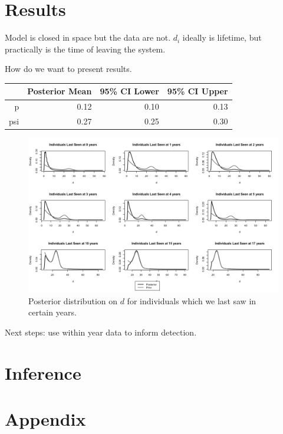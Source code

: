 \documentclass[12pt, a4paper]{article}
\begin{document}
\section{Results}

Model is closed in space but the data are not. $d_i$ ideally is lifetime, but practically is the time of leaving the system. 

How do we want to present results. 

\begin{table}[ht]
\centering
\begin{tabular}{rrrr}
  \hline
   & Posterior Mean & 95\% CI Lower & 95\% CI Upper \\ 
  \hline
  p & 0.12 & 0.10 & 0.13 \\ 
  psi & 0.27 & 0.25 & 0.30 \\ 
   \hline
\end{tabular}
\end{table}

\begin{figure}
\centering
\includegraphics[width = \textwidth]{Posterior.d.png}
\caption{Posterior distribution on $d$ for individuals which we last saw in certain years.}
\end{figure}

Next steps: use within year data to inform detection.

\section{Inference}





\section{Appendix}
\end{document}
